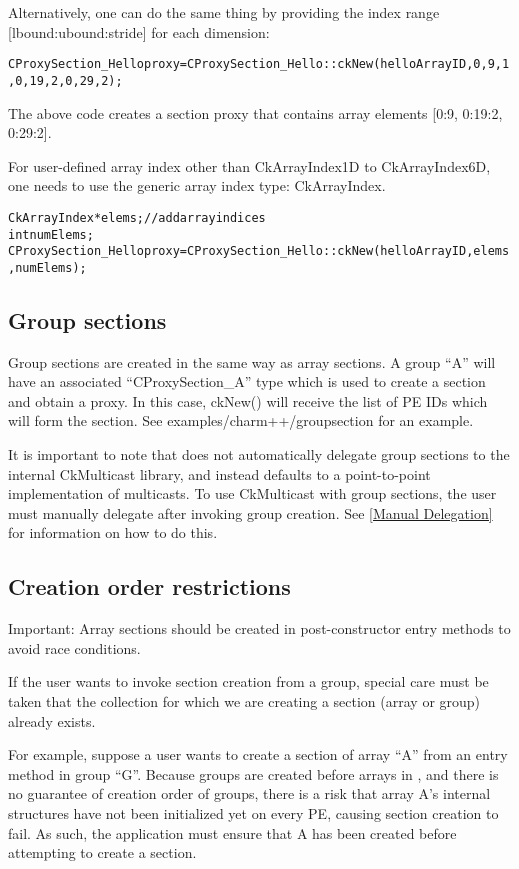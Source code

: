Alternatively, one can do the same thing by providing the index range [lbound:ubound:stride]
for each dimension:

\begin{alltt}
  CProxySection_Hello proxy = CProxySection_Hello::ckNew(helloArrayID, 0, 9, 1, 0, 19, 2, 0, 29, 2);
\end{alltt}

The above code creates a section proxy that contains array elements
[0:9, 0:19:2, 0:29:2].

For user-defined array index other than CkArrayIndex1D to CkArrayIndex6D,
one needs to use the generic array index type: CkArrayIndex.

\begin{alltt}
  CkArrayIndex *elems;    // add array indices
  int numElems;
  CProxySection_Hello proxy = CProxySection_Hello::ckNew(helloArrayID, elems, numElems);
\end{alltt}

\subsection{Group sections}

Group sections are created in the same way as array sections.
A group ``A'' will have an associated ``CProxySection\_A'' type which is used to create a section
and obtain a proxy.
In this case, ckNew() will receive the list of PE IDs which will form the section.
See examples/charm++/groupsection for an example.

It is important to note that \charmpp{} does not automatically delegate group sections to the
internal CkMulticast library,
and instead defaults to a point-to-point implementation of multicasts.
To use CkMulticast with group sections, the user must manually delegate after invoking group creation.
See \ref{Manual Delegation} for information on how to do this.

\subsection{Creation order restrictions}

Important: Array sections should be created in post-constructor entry methods to avoid race conditions.

If the user wants to invoke section creation from a group, special care must be taken
that the collection for which we are creating a section (array or group) already exists.

For example, suppose a user wants to create a section of array ``A'' from an entry
method in group ``G''. Because groups are created before arrays in \charmpp{}, and
there is no guarantee of creation order of groups, there is a risk that array A's
internal structures have not been initialized yet on every PE, causing section creation to fail.
As such, the application must ensure that A has been created
before attempting to create a section.

